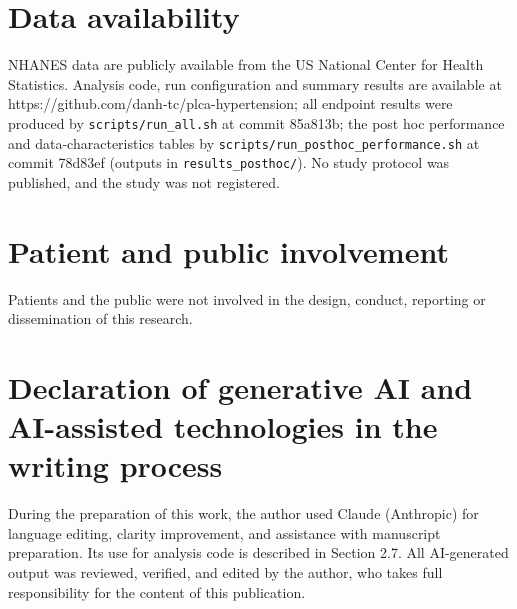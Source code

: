 \documentclass[final,5p,times,twocolumn]{elsarticle}
\begin{document}
\section*{Data availability}

NHANES data are publicly available from the US National Center for
Health Statistics. Analysis code, run configuration and summary results
are available at https://github.com/danh-tc/plca-hypertension; all
endpoint results were produced by \texttt{scripts/\allowbreak{}run\_\allowbreak{}all.sh} at commit
85a813b; the post hoc performance and data-characteristics tables by
\texttt{scripts/\allowbreak{}run\_\allowbreak{}posthoc\_\allowbreak{}performance.sh} at commit 78d83ef (outputs
in \texttt{results\_\allowbreak{}posthoc/\allowbreak{}}). No study protocol was published, and the
study was not registered.

\section*{Patient and public involvement}

Patients and the public were not involved in the design, conduct,
reporting or dissemination of this research.

\section*{Declaration of generative AI and AI-assisted technologies in
the writing process}

During the preparation of this work, the author used Claude (Anthropic)
for language editing, clarity improvement, and assistance with
manuscript preparation. Its use for analysis code is described in
Section 2.7. All AI-generated output was reviewed, verified, and edited
by the author, who takes full responsibility for the content of this
publication.
\end{document}
